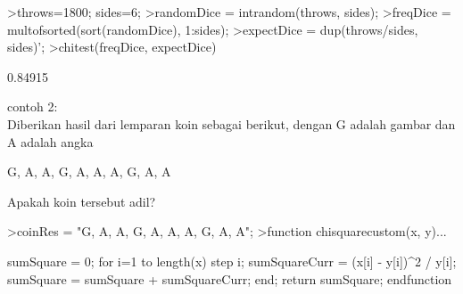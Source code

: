 \documentclass[a4paper,10pt]{article}
\begin{document}
\begin{eulernotebook}
\begin{eulercomment}
\begin{eulercomment}
\begin{eulercomment}
\begin{eulercomment}
\begin{eulercomment}
\begin{eulercomment}
\begin{eulercomment}
\begin{eulercomment}
\begin{eulercomment}
\begin{eulercomment}
\begin{eulercomment}
\begin{eulercomment}
\begin{eulercomment}
\begin{eulercomment}
\begin{eulercomment}
\begin{eulercomment}
\begin{eulercomment}
\begin{eulercomment}
\begin{eulercomment}
\begin{eulercomment}
\begin{eulercomment}
\begin{eulercomment}
\begin{eulercomment}
\begin{eulercomment}
\begin{eulercomment}
\begin{eulercomment}
\begin{eulercomment}
\begin{eulercomment}
\begin{eulercomment}
\begin{eulercomment}
\begin{eulercomment}
\begin{eulercomment}
\begin{eulercomment}
\begin{eulercomment}
\begin{eulercomment}
\begin{eulercomment}
\begin{eulercomment}
\begin{eulercomment}
\begin{eulercomment}
\begin{eulercomment}
\begin{eulercomment}
\begin{eulercomment}
\begin{eulercomment}
\begin{eulercomment}
\begin{eulercomment}
\begin{eulercomment}
\begin{eulercomment}
\begin{eulercomment}
\begin{eulercomment}
\begin{eulercomment}
\begin{eulerprompt}
>throws=1800; sides=6;
>randomDice = intrandom(throws, sides);
>freqDice = multofsorted(sort(randomDice), 1:sides);
>expectDice = dup(throws/sides, sides)';
>chitest(freqDice, expectDice)
\end{eulerprompt}
\begin{euleroutput}
  0.84915
\end{euleroutput}
\begin{eulercomment}
contoh 2:\\
Diberikan hasil dari lemparan koin sebagai berikut, dengan G adalah
gambar dan A adalah angka

G, A, A, G, A, A, A, G, A, A

Apakah koin tersebut adil?
\end{eulercomment}
\begin{eulerprompt}
>coinRes = "G, A, A, G, A, A, A, G, A, A";
>function chisquarecustom(x, y)...
\end{eulerprompt}
\begin{eulerudf}
  sumSquare = 0;
  for i=1 to length(x) step i;
     sumSquareCurr = (x[i] - y[i])^2 / y[i];
     sumSquare = sumSquare + sumSquareCurr;
  end;
  return sumSquare;
  endfunction
\end{eulerudf}

\end{eulercomment}
\end{eulercomment}
\end{eulercomment}
\end{eulercomment}
\end{eulercomment}
\end{eulercomment}
\end{eulercomment}
\end{eulercomment}
\end{eulercomment}
\end{eulercomment}
\end{eulercomment}
\end{eulercomment}
\end{eulercomment}
\end{eulercomment}
\end{eulercomment}
\end{eulercomment}
\end{eulercomment}
\end{eulercomment}
\end{eulercomment}
\end{eulercomment}
\end{eulercomment}
\end{eulercomment}
\end{eulercomment}
\end{eulercomment}
\end{eulercomment}
\end{eulercomment}
\end{eulercomment}
\end{eulercomment}
\end{eulercomment}
\end{eulercomment}
\end{eulercomment}
\end{eulercomment}
\end{eulercomment}
\end{eulercomment}
\end{eulercomment}
\end{eulercomment}
\end{eulercomment}
\end{eulercomment}
\end{eulercomment}
\end{eulercomment}
\end{eulercomment}
\end{eulercomment}
\end{eulercomment}
\end{eulercomment}
\end{eulercomment}
\end{eulercomment}
\end{eulercomment}
\end{eulercomment}
\end{eulercomment}
\end{eulercomment}
\end{eulernotebook}
\end{document}
